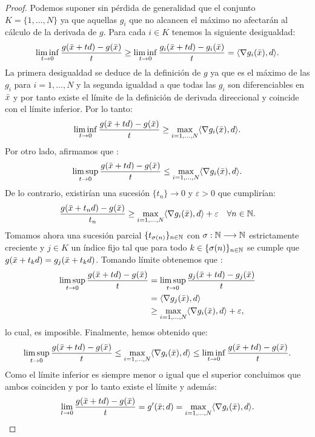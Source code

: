 	\begin{proof}
		Podemos suponer sin pérdida de generalidad que el conjunto $ K = \{1, ..., N \} $ ya que aquellas $ g_i $ que no alcancen el máximo no afectarán al cálculo de la derivada de $ g $. Para cada $ i \in K $ tenemos la siguiente desigualdad:
		\begin{equation*}
			\liminf_{t\rightarrow0}\frac{g(\bar{x}+td) - g(\bar{x})}{t} \geq \liminf_{t\rightarrow0}\frac{g_i(\bar{x}+td) - g_i(\bar{x})}{t} = \langle \nabla g_i(\bar{x}), d \rangle.
		\end{equation*}	
		La primera desigualdad se deduce de la definición de $ g $ ya que es el máximo de las $ g_i $ para $ i=1,...,N$ y la segunda igualdad a que todas las $ g_i $ son diferenciables en $ \bar{x} $ y por tanto existe el límite de la definición de derivada direccional y coincide con el límite inferior. Por lo tanto:
		\[
		\liminf_{t\rightarrow0}\frac{g(\bar{x}+td) - g(\bar{x})}{t} \geq \max_{i=1,...,N}\langle \nabla g_i(\bar{x}), d \rangle.
		\]
		Por otro lado, afirmamos que :
		\begin{equation*}
			\limsup_{t\rightarrow0}\frac{g(\bar{x}+td) - g(\bar{x})}{t} \leq \max_{i=1,...,N}\langle \nabla g_i(\bar{x}), d \rangle.
		\end{equation*}
		De lo contrario, existirían una sucesión $ \{t_n\}\rightarrow 0 $ y $ \varepsilon > 0 $ que cumplirían:
		\[
		\frac{g(\bar{x}+t_n d) - g(\bar{x})}{t_n} \geq \max_{i=1,...,N}\langle \nabla g_i(\bar{x}), d \rangle + \varepsilon \quad \forall n \in \mathbb{N}.
		\]
		Tomamos ahora una sucesión parcial $ \{t_{\sigma(n)}\}_{n \in \mathbb{N}} $ con $ \sigma:\mathbb{N} \longrightarrow \mathbb{N} $ estrictamente creciente y $ j \in K $ un índice fijo tal que para todo $ k \in \{\sigma(n)\}_{n \in \mathbb{N}} $ se cumple que $ g(\bar{x} + t_k d) = g_j (\bar{x} + t_k d)$. Tomando límite obtenemos que :
		\begin{equation*}
		\begin{split}
		\limsup_{t\rightarrow0}\frac{g(\bar{x}+td) - g(\bar{x})}{t} &= 	\limsup_{t\rightarrow0}\frac{g_j(\bar{x}+td) - g_j(\bar{x})}{t} \\
		&= \langle \nabla g_j(\bar{x}), d \rangle \\ &\geq \max_{i=1,...,N}\langle \nabla g_i(\bar{x}), d \rangle + \varepsilon,
		\end{split}
		\end{equation*}
		lo cual, es imposible. Finalmente, hemos obtenido que:
		\[
		\limsup_{t\rightarrow0}\frac{g(\bar{x}+td) - g(\bar{x})}{t} \leq \max_{i=1,...,N}\langle \nabla g_i(\bar{x}), d \rangle \leq 	\liminf_{t\rightarrow0}\frac{g(\bar{x}+td) - g(\bar{x})}{t}.
		\]
		Como el límite inferior es siempre menor o igual que el superior concluimos que ambos coinciden y por lo tanto existe el límite y además:
		\[
		\lim_{t\rightarrow0}\frac{g(\bar{x}+td) - g(\bar{x})}{t} = g'(\bar{x};d) = \max_{i=1,...,N}\langle \nabla g_i(\bar{x}), d \rangle.
		\]
	\end{proof}

